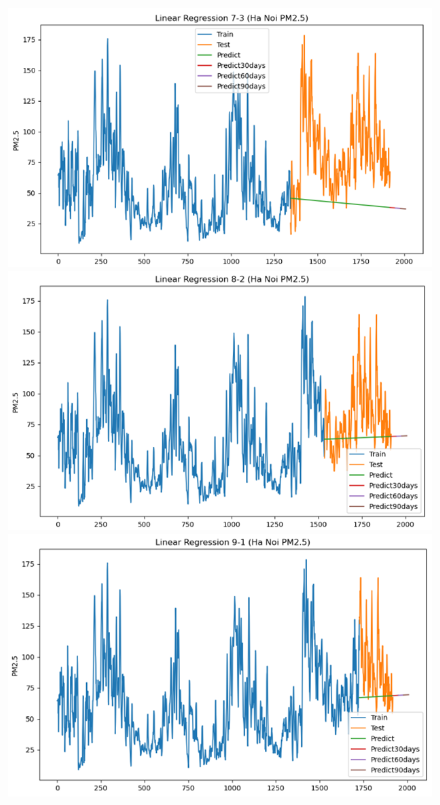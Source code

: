 \begin{figure}[H]
{\begin{adjustbox}{minipage=0.475\textwidth}
\begin{minipage}{0.3\textwidth}
            \end{minipage}\hfill
            \begin{minipage}{0.3\textwidth}
                \centering
                \includegraphics[width=\textwidth, height=0.5\textwidth]{img/final/Linear Regression/90D/LN_7_3_HN.png}\\
                \includegraphics[width=\textwidth,height=0.5\textwidth]{img/final/Linear Regression/90D/LN_8_2_HN.png}\\
                \includegraphics[width=\textwidth, height=0.5\textwidth]{img/final/Linear Regression/90D/LN_9_1_HN.png}
            \end{minipage}\hfill

\end{adjustbox}}
\end{figure}
